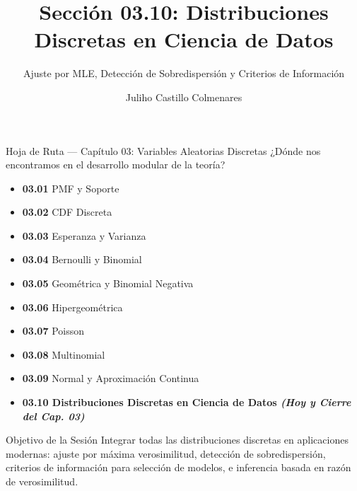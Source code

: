 \documentclass[10pt, aspectratio=169]{beamer}
\title[Distribuciones en Ciencia de Datos]{Sección 03.10: Distribuciones Discretas en Ciencia de Datos}
\subtitle{Ajuste por MLE, Detección de Sobredispersión y Criterios de Información}
\author[J. Castillo Colmenares]{Juliho Castillo Colmenares}
\institute{Tecnológico de Monterrey}
\date{\vspace{-1.2cm}}
\begin{document}
\begin{frame}[plain]
  \vspace{-0.8cm}
  \titlepage
\end{frame}

\begin{frame}{Hoja de Ruta --- Capítulo 03: Variables Aleatorias Discretas}
  \footnotesize
  ¿Dónde nos encontramos en el desarrollo modular de la teoría? \pause
  \begin{itemize}\itemsep=0.08em
    \item \textbf{03.01} PMF y Soporte \pause
    \item \textbf{03.02} CDF Discreta \pause
    \item \textbf{03.03} Esperanza y Varianza \pause
    \item \textbf{03.04} Bernoulli y Binomial \pause
    \item \textbf{03.05} Geométrica y Binomial Negativa \pause
    \item \textbf{03.06} Hipergeométrica \pause
    \item \textbf{03.07} Poisson \pause
    \item \textbf{03.08} Multinomial \pause
    \item \textbf{03.09} Normal y Aproximación Continua \pause
    \item \color{TecRojo}\textbf{03.10 Distribuciones Discretas en Ciencia de Datos \emph{(Hoy y Cierre del Cap. 03)}}\color{black}
  \end{itemize}
  \vspace{-0.05cm}
  \begin{block}{Objetivo de la Sesión}
    Integrar todas las distribuciones discretas en aplicaciones modernas: ajuste por máxima verosimilitud, detección de sobredispersión, criterios de información para selección de modelos, e inferencia basada en razón de verosimilitud.
  \end{block}
\end{frame}
\end{document}

